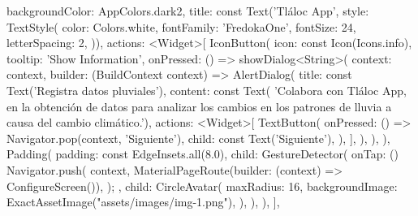 backgroundColor: AppColors.dark2,
title: const Text('Tláloc App',
    style: TextStyle(
      color: Colors.white,
      fontFamily: 'FredokaOne',
      fontSize: 24,
      letterSpacing: 2,
    )),
actions: <Widget>[
  IconButton(
    icon: const Icon(Icons.info),
    tooltip: 'Show Information',
    onPressed: () => showDialog<String>(
      context: context,
      builder: (BuildContext context) => AlertDialog(
        title: const Text('Registra datos pluviales'),
        content: const Text(
            'Colabora con Tláloc App, en la obtención de datos para analizar los cambios en los patrones de lluvia a causa del cambio climático.'),
        actions: <Widget>[
          TextButton(
            onPressed: () => Navigator.pop(context, 'Siguiente'),
            child: const Text('Siguiente'),
          ),
        ],
      ),
    ),
  ),
  Padding(
    padding: const EdgeInsets.all(8.0),
    child: GestureDetector(
      onTap: () {
        Navigator.push(
          context,
          MaterialPageRoute(builder: (context) => ConfigureScreen()),
        );
      },
      child: CircleAvatar(
        maxRadius: 16,
        backgroundImage: ExactAssetImage("assets/images/img-1.png"),
      ),
    ),
  ),
],





    
